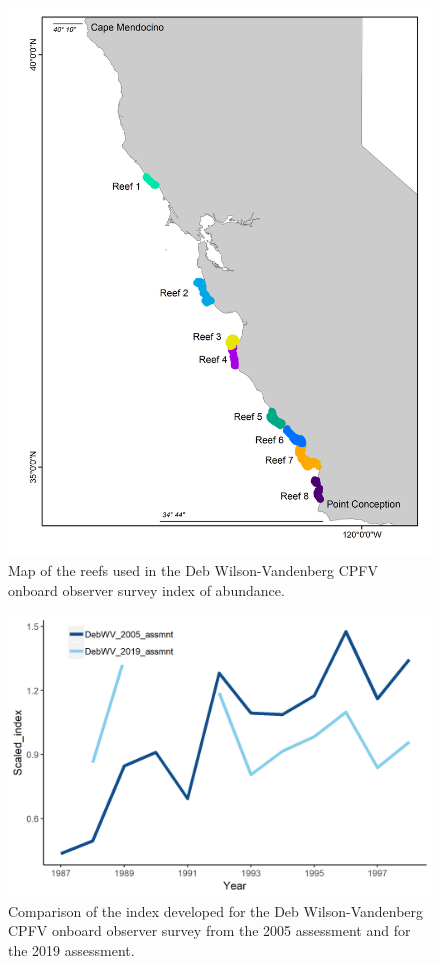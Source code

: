 \documentclass[12pt,]{article}
\begin{document}
\FloatBarrier

\begin{figure}
\centering
\includegraphics{Figures/DebWV_sites.png}
\caption{Map of the reefs used in the Deb Wilson-Vandenberg CPFV onboard
observer survey index of abundance. \label{fig:DebWV_sites}}
\end{figure}

\begin{figure}
\centering
\includegraphics{Figures/DebWV_index_compare.png}
\caption{Comparison of the index developed for the Deb Wilson-Vandenberg
CPFV onboard observer survey from the 2005 assessment and for the 2019
assessment. \label{fig:DebWV_index_compare}}
\end{figure}
\end{document}
